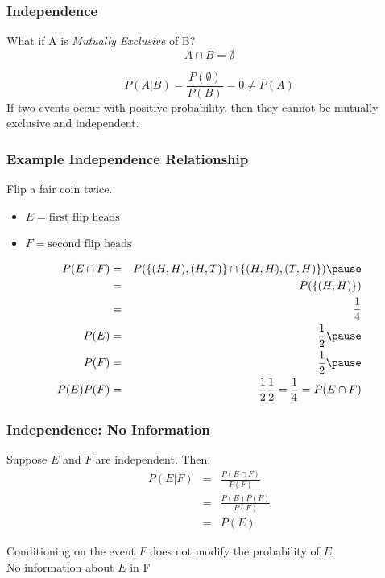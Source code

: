 \documentclass[aspectratio=169]{beamer}
\numberwithin{equation}{section}
\begin{document}
\begin{frame}
\frametitle{Independence}
What if A is \emph{Mutually Exclusive} of B?\pause
 $$A\cap B=\emptyset$$\pause
 
  $$P(A|B)=\frac{P(\emptyset)}{P(B)}=0\neq P(A)$$
 \pause
 If two events occur with positive probability, then they cannot be mutually exclusive and independent.
 \end{frame}




\begin{frame}
\frametitle{Example Independence Relationship}

Flip a fair coin twice.  
\begin{itemize}
\item[] $E = \text{first flip heads} $
\item[] $F = \text{second flip heads} $
\end{itemize}\pause
\begin{eqnarray}
P(E \cap F ) & = & P( \{ (H, H) , (H, T) \} \cap \{ (H, H), (T, H) \} ) \nonumber \pause \\
 & =& P( \{(H, H)\} ) \nonumber \\ 
 & = & \frac{1}{4} \nonumber \\
P(E ) & = & \frac{1} {2} \nonumber \pause \\
P(F) & = & \frac{1}{2} \nonumber \pause \\
P(E)P(F)  & =& \frac{1}{2}\frac{1}{2} = \frac{1}{4}  =P(E \cap F )  \nonumber 
 \end{eqnarray} 
 
 

\end{frame}

\begin{frame}
\frametitle{Independence: No Information} 

Suppose $E$ and $F$ are independent.  Then, 
\begin{eqnarray}
P(E|F ) & = & \frac{P(E \cap F) }{P(F) } \nonumber \\
& = & \frac{P(E)P(F)}{P(F)}\nonumber \\
& = & P(E) \nonumber 
\end{eqnarray}


Conditioning on the event $F$ does not modify the probability of $E$.  \\
\alert{No information about $E$ in F}  \\

\end{frame}
\end{document}
